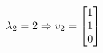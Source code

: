 \documentclass[preview]{standalone}
\begin{document}
\begin{align*}
\special{dvisvgm:raw <g id='unique000'>}\lambda_2 = 2 \Rightarrow v_2 = \begin{bmatrix} 1 \\ 1 \\ 0 \end{bmatrix}\special{dvisvgm:raw </g>}
\end{align*}
\end{document}
